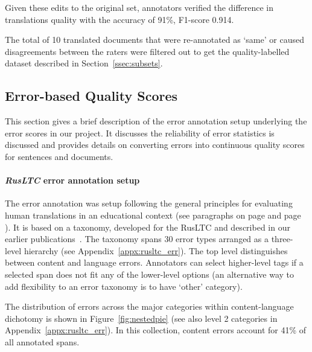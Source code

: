 Given these edits to the original set, annotators verified the difference in translations quality with the accuracy of 91\%, F1-score 0.914.

The total of 10 translated documents that were re-annotated as `same' or caused disagreements between the raters were filtered out to get the quality-labelled dataset described in Section~\ref{ssec:subsets}.

\subsection{\label{ssec:err}Error-based Quality Scores}
This section gives a brief description of the error annotation setup underlying the error scores in our project. It discusses the reliability of error statistics is discussed and provides details on converting errors into continuous quality scores for sentences and documents.  

\paragraph{\textit{RusLTC} error annotation setup} 
The error annotation was setup following the general principles for evaluating human translations in an educational context (see paragraphs on page \pageref{par:ht_ass} and page \pageref{par:errors_best}). It is based on a taxonomy, developed for the RusLTC and described in our earlier publications~\cite{Kunilovskaya2017err}. The taxonomy spans 30 error types arranged as a three-level hierarchy (see Appendix~\ref{appx:rusltc_err}). The top level distinguishes between content and language errors. Annotators can select higher-level tags if a selected span does not fit any of the lower-level options (an alternative way to add flexibility to an error taxonomy is to have `other' category).

The distribution of errors across the major categories within content-language dichotomy is shown in Figure~\ref{fig:nestedpie} (see also level 2 categories in Appendix~\ref{appx:rusltc_err}). In this collection, content errors account for 41\% of all annotated spans. 


